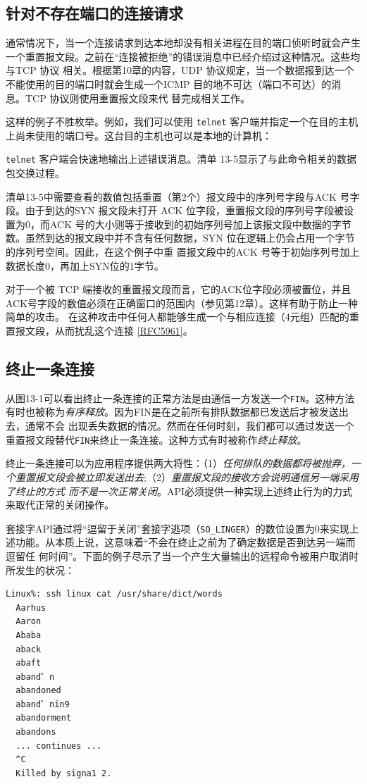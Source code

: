 \subsection{针对不存在端口的连接请求}
通常情况下，当一个连接请求到达本地却没有相关进程在目的端口侦听时就会产生一个重置报文段。之前在“连接被拒绝”的错误消息中已经介绍过这种情况。这些均与TCP 协议
相关。根据第10章的内容，UDP 协议规定，当一个数据报到达一个不能使用的目的端口时就会生成一个ICMP
目的地不可达（端口不可达）的消息。TCP 协议则使用重置报文段来代
替完成相关工作。

这样的例子不胜枚举。例如，我们可以使用 \verb|telnet| 客户端并指定一个在目的主机上尚未使用的端口号。这台目的主机也可以是本地的计算机：

\verb|telnet| 客户端会快速地输出上述错误消息。清单 13-5显示了与此命令相关的数据包交换过程。

清单13-5中需要查看的数值包括重置（第2个）报文段中的序列号字段与ACK 号字段。由于到达的SYN 报文段未打开 ACK
位字段，重置报文段的序列号字段被设置为0，而ACK
号的大小则等于接收到的初始序列号加上该报文段中数据的字节数。虽然到达的报文段中并不含有任何数据，SYN
位在逻辑上仍会占用一个字节的序列号空间。因此，在这个例子中重
置报文段中的ACK 号等于初始序列号加上数据长度0，再加上SYN位的1字节。

对于一个被 TCP 端接收的重置报文段而言，它的ACK位字段必须被置位，并且
ACK号字段的数值必须在正确窗口的范围内（参见第12章）。这样有助于防止一种简单的攻击。
在这种攻击中任何人都能够生成一个与相应连接（4元组）匹配的重置报文段，从而扰乱这个连接
\href{https://www.rfc-editor.org/rfc/rfc5961}{[RFC5961]}。
\subsection{终止一条连接}
从图13-1可以看出终止一条连接的正常方法是由通信一方发送一个\verb|FIN|。这种方法有时也被称为\emph{\color{purple}有序释放}。因为FIN是在之前所有排队数据都已发送后才被发送出去，通常不会
出现丢失数据的情况。然而在任何时刻，我们都可以通过发送一个重置报文段替代\verb|FIN|来终止一条连接。这种方式有时被称作\emph{\color{purple}终止释放}。

终止一条连接可以为应用程序提供两大将性：（1）\emph{任何排队的数据都将被抛弃，一个重置报文段会被立即发送出去};（2）\emph{重置报文段的接收方会说明通信另一端采用了终止的方式
而不是一次正常关闭}。API必须提供一种实现上述终止行为的力式来取代正常的关闭操作。

套接字API通过将“逗留于关闭”套接字逃项（\verb|SO_LINGER|）的数位设置为0来实现上述功能。从本质上说，这意味着“不会在终止之前为了确定数据是否到达另一端而逗留任
何时间”。下面的例子尽示了当一个产生大量输出的远程命令被用户取消时所发生的状况：
\begin{lstlisting}[language=bash, caption=Hello world program., label=listing:hello_world]
  Linux%: ssh linux cat /usr/share/dict/words
  Aarhus
  Aaron
  Ababa
  aback
  abaft
  aband゜n
  abandoned
  aband゜nin9
  abandorment
  abandons
  ... continues ...
  ^C
  Killed by signa1 2.
\end{lstlisting}

